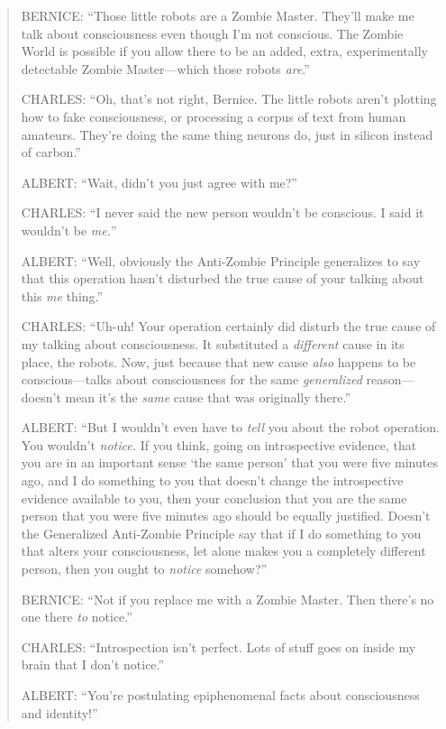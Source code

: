 \begin{quotation}
{
 BERNICE: ``Those little robots are a Zombie
Master. They'll make me talk about consciousness even
though I'm not conscious. The Zombie World is possible
if you allow there to be an added, extra, experimentally detectable
Zombie Master---which those robots \textit{are}.''}

{
 CHARLES: ``Oh, that's not right,
Bernice. The little robots aren't plotting how to fake
consciousness, or processing a corpus of text from human amateurs.
They're doing the same thing neurons do, just in
silicon instead of carbon.''}

{
 ALBERT: ``Wait, didn't you just
agree with me?''}

{
 CHARLES: ``I never said the new person
wouldn't be conscious. I said it
wouldn't be \textit{me.}''}

{
 ALBERT: ``Well, obviously the Anti-Zombie
Principle generalizes to say that this operation hasn't
disturbed the true cause of your talking about this \textit{me}
thing.''}

{
 CHARLES: ``Uh-uh! Your operation certainly did
disturb the true cause of my talking about consciousness. It
substituted a \textit{different} cause in its place, the robots. Now,
just because that new cause \textit{also} happens to be
conscious---talks about consciousness for the same \textit{generalized}
reason---doesn't mean it's the
\textit{same} cause that was originally there.''}

{
 ALBERT: ``But I wouldn't even
have to \textit{tell} you about the robot operation. You
wouldn't \textit{notice.} If you think, going on
introspective evidence, that you are in an important sense
`the same person' that you were five
minutes ago, and I do something to you that doesn't
change the introspective evidence available to you, then your
conclusion that you are the same person that you were five minutes ago
should be equally justified. Doesn't the Generalized
Anti-Zombie Principle say that if I do something to you that alters
your consciousness, let alone makes you a completely different person,
then you ought to \textit{notice} somehow?''}

{
 BERNICE: ``Not if you replace me with a Zombie
Master. Then there's no one there \textit{to}
notice.''}

{
 CHARLES: ``Introspection isn't
perfect. Lots of stuff goes on inside my brain that I
don't notice.''}

{
 ALBERT: ``You're postulating
epiphenomenal facts about consciousness and
identity!''}


\end{quotation}
